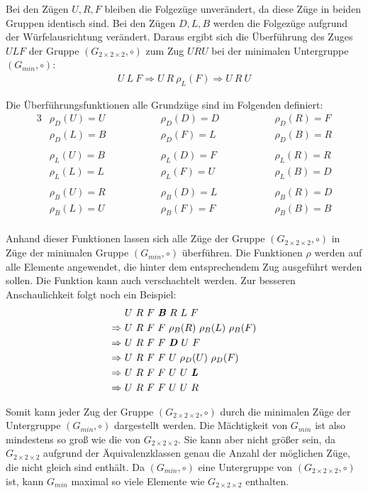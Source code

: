 \documentclass[12pt,a4paper, usenames, dvipsnames]{article}
\theoremstyle{mystyle}
\theoremstyle{definition}
\newcommand{\Gtwo}{\ensuremath{G_{2\times 2\times 2}}}
\begin{document}
Bei den Zügen $U, R, F$ bleiben die Folgezüge unverändert, da diese Züge in beiden Gruppen identisch sind. Bei den Zügen $D, L, B$ werden die Folgezüge aufgrund der Würfelausrichtung verändert. Daraus ergibt sich die Überführung des Zuges $ULF$ der Gruppe $(\Gtwo, \circ)$ zum Zug $URU$ bei der minimalen Untergruppe $(G_{min}, \circ)$:
\begin{align*}
U \ L \ F \Rightarrow U \ R \ \rho_L(F) \Rightarrow U \ R \ U
\end{align*}

Die Überführungsfunktionen alle Grundzüge sind im Folgenden definiert:
\begin{alignat*}{3}
 & \rho_D(U) = U \qquad \qquad  && \rho_D(D) = D  \qquad \qquad && \rho_D(R) = F  \\
 & \rho_D(L) = B    && \rho_D(F) = L    && \rho_D(B) =  R \\
\\
 & \rho_L(U) = B  && \rho_L(D) = F  && \rho_L(R) = R \\
 & \rho_L(L) = L  && \rho_L(F) = U  && \rho_L(B) = D  \\
\\
 & \rho_B(U) = R && \rho_B(D) = L   && \rho_B(R) = D \\
 & \rho_B(L) = U  && \rho_B(F) =  F && \rho_B(B) = B  \\
\end{alignat*}

Anhand dieser Funktionen lassen sich alle Züge der Gruppe $(\Gtwo, \circ)$ in Züge der minimalen Gruppe $(G_{min}, \circ)$ überführen. Die Funktionen $\rho$ werden auf alle Elemente angewendet, die hinter dem entsprechendem Zug ausgeführt werden sollen. Die Funktion kann auch verschachtelt werden. Zur besseren Anschaulichkeit folgt noch ein Beispiel:
\begin{align*}
& U \ R \ F \ \textbf{\textit{B}} \ R \ L \ F  \\ 
\Rightarrow \ & U \ R \ F \ F \ \rho_B(R) \ \rho_B(L) \ \rho_B(F) \\
\Rightarrow \ & U \ R \ F \ F \ \textbf{\textit{D}} \ U \ F \\
\Rightarrow \ & U \ R \ F \ F \ U \ \rho_D(U) \ \rho_D(F) \\
\Rightarrow  \ & U \ R \ F \ F \ U \ U \ \textbf{\textit{L}} \\
\Rightarrow \ & U \ R \ F \ F \ U \ U \ R
\end{align*}

Somit kann jeder Zug der Gruppe $(\Gtwo, \circ)$ durch die minimalen Züge der Untergruppe  $(G_{min}, \circ)$ dargestellt werden. Die Mächtigkeit von $G_{min}$ ist also mindestens so groß wie die von $\Gtwo$. Sie kann aber nicht größer sein, da $\Gtwo$ aufgrund der Äquivalenzklassen genau die Anzahl der möglichen Züge, die nicht gleich sind enthält. Da $(G_{min}, \circ)$ eine Untergruppe von $(\Gtwo, \circ)$ ist, kann $G_{min}$ maximal so viele Elemente wie $\Gtwo$ enthalten.
\end{document}

